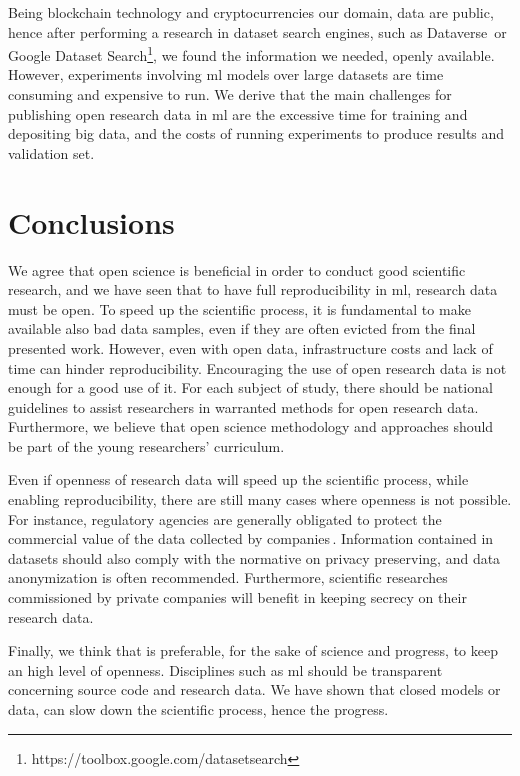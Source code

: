 Being blockchain technology and cryptocurrencies our domain,
data are public, hence after performing a research in dataset search engines, such as
Dataverse\,\cite{crosas2011dataverse} or Google Dataset
Search\footnote{https://toolbox.google.com/datasetsearch},
we found the information we needed, openly available. However, experiments involving \ac{ml} models
over large datasets are time consuming and expensive to run. We derive that the main
challenges for publishing open research data in \ac{ml} are the excessive time for training and
depositing big data, and the costs of running experiments to produce results and validation set.

\section{Conclusions}
We agree that open science is beneficial in order to conduct good scientific research,
and we have seen that to have full reproducibility in \ac{ml}, research data must be open.
To speed up the scientific process, it is fundamental to make available also bad data samples, even if
they are often evicted from the final presented work.
However, even with open data, infrastructure costs and lack of time can hinder reproducibility.
Encouraging the use of open research data is not enough for a good use of it. For each subject of study,
there should be national guidelines to assist researchers in warranted methods for open research data.
Furthermore, we believe that open science methodology and approaches should
be part of the young researchers' curriculum.

Even if openness of research data will speed up the scientific process,
while enabling reproducibility, there are still many cases where openness is not
possible. For instance, regulatory agencies are generally obligated to protect the commercial
value of the data collected by companies\,\cite{national2016principles}.
Information contained in datasets should also comply with the normative on privacy preserving,
and data anonymization is often recommended. Furthermore, scientific researches
commissioned by private companies will benefit in keeping secrecy on their research data.

Finally, we think that is preferable, for the sake of science and progress, to keep an high
level of openness. Disciplines such as \ac{ml} should be transparent concerning source code
and research data. We have shown that closed models or data, can slow
down the scientific process, hence the progress.



